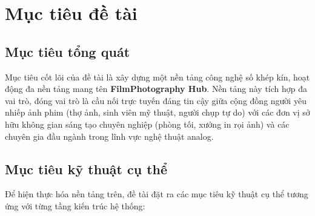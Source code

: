 \section{Mục tiêu đề tài}

\subsection{Mục tiêu tổng quát}
Mục tiêu cốt lõi của đề tài là xây dựng một nền tảng công nghệ số khép kín, hoạt động đa nền tảng mang tên \textbf{FilmPhotography Hub}. Nền tảng này tích hợp đa vai trò, đóng vai trò là cầu nối trực tuyến đáng tin cậy giữa cộng đồng người yêu nhiếp ảnh phim (thợ ảnh, sinh viên mỹ thuật, người chụp tự do) với các đơn vị sở hữu không gian sáng tạo chuyên nghiệp (phòng tối, xưởng in rọi ảnh) và các chuyên gia đầu ngành trong lĩnh vực nghệ thuật analog.

\subsection{Mục tiêu kỹ thuật cụ thể}
Để hiện thực hóa nền tảng trên, đề tài đặt ra các mục tiêu kỹ thuật cụ thể tương ứng với từng tầng kiến trúc hệ thống:

